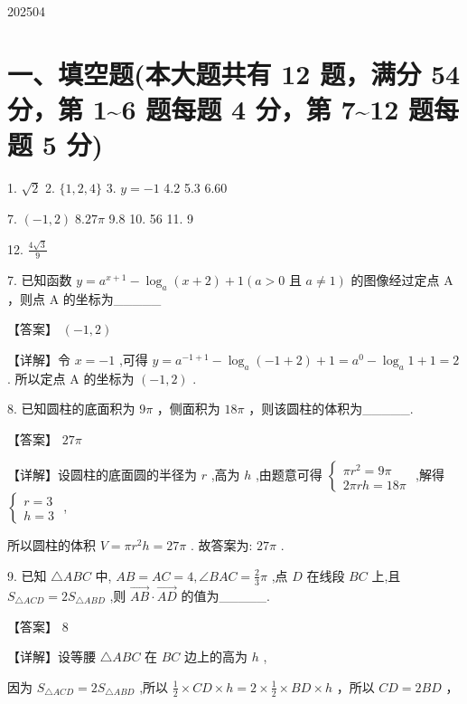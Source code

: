 \documentclass[10pt]{article}
\begin{document}
202504

\section*{一、填空题(本大题共有 12 题，满分 54 分，第 1\textasciitilde 6 题每题 4 分，第 7\textasciitilde 12 题每题 5 分)}

1. \(\sqrt{2}\) 2. \(\{ 1,2,4\}\) 3. \(y =  - 1\) 4.2 5.3 6.60

7. \(\left( {-1,2}\right) \; {8.27\pi }\) 9.8 10. 56 11. 9

12. \(\frac{4\sqrt{3}}{9}\)

7. 已知函数 \(y = {a}^{x + 1} - {\log }_{a}\left( {x + 2}\right)  + 1\left( {a > 0\text{ 且 }a \neq  1}\right)\) 的图像经过定点 \(\mathrm{A}\) ，则点 \(\mathrm{A}\) 的坐标为\_\_\_\_\_

【答案】 \(\left( {-1,2}\right)\)

【详解】令 \(x =  - 1\) ,可得 \(y = {a}^{-1 + 1} - {\log }_{a}\left( {-1 + 2}\right)  + 1 = {a}^{0} - {\log }_{a}1 + 1 = 2\) . 所以定点 \(\mathrm{A}\) 的坐标为 \(\left( {-1,2}\right)\) .

8. 已知圆柱的底面积为 \({9\pi }\) ，侧面积为 \({18\pi }\) ，则该圆柱的体积为\_\_\_\_\_.

【答案】 \({27\pi }\)

【详解】设圆柱的底面圆的半径为 \(r\) ,高为 \(h\) ,由题意可得 \(\left\{  \begin{array}{l} \pi {r}^{2} = {9\pi } \\  {2\pi rh} = {18\pi } \end{array}\right.\) ,解得 \(\left\{  \begin{array}{l} r = 3 \\  h = 3 \end{array}\right.\) ,

所以圆柱的体积 \(V = \pi {r}^{2}h = {27\pi }\) . 故答案为: \({27\pi }\) .

9. 已知 \(\bigtriangleup {ABC}\) 中, \({AB} = {AC} = 4,\angle {BAC} = \frac{2}{3}\pi\) ,点 \(D\) 在线段 \({BC}\) 上,且 \({S}_{\bigtriangleup {ACD}} = 2{S}_{\bigtriangleup {ABD}}\) ,则 \(\overrightarrow{AB} \cdot  \overrightarrow{AD}\) 的值为\_\_\_\_\_.

【答案】 8

【详解】设等腰 \(\bigtriangleup {ABC}\) 在 \({BC}\) 边上的高为 \(h\) ,

因为 \({S}_{\bigtriangleup {ACD}} = 2{S}_{\bigtriangleup {ABD}}\) ,所以 \(\frac{1}{2} \times  {CD} \times  h = 2 \times  \frac{1}{2} \times  {BD} \times  h\) ，所以 \({CD} = {2BD}\) ，
\end{document}
